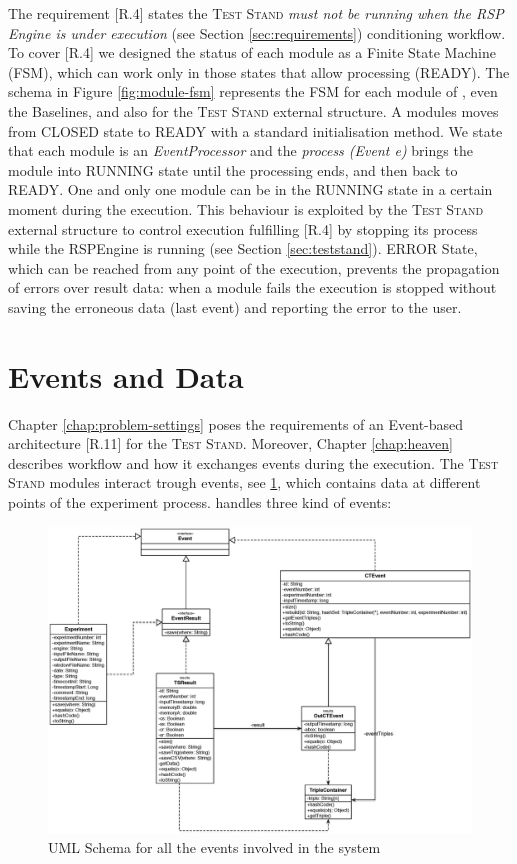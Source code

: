 The requirement [R.4] states the \textsc{Test Stand} \textit{must not be running when the RSP Engine is under execution} (see Section \ref{sec:requirements}) conditioning \name workflow. To cover [R.4] we designed the status of each module  as a Finite State Machine (FSM), which can work only in those states that allow processing (READY). The schema in Figure \ref{fig:module-fsm} represents the FSM for each module of \name, even the Baselines, and also for the \textsc{Test Stand} external structure. 
A modules moves from CLOSED state to READY with a standard initialisation method. We state that each module is an \textit{EventProcessor} and the \textit{ process (Event e)} brings the module into RUNNING state until the processing ends, and then back to READY. One and only one module can be in the RUNNING state in a certain moment during the execution. This behaviour is exploited by the \textsc{Test Stand} external structure to control execution fulfilling [R.4] by stopping its process while the RSPEngine is running (see Section \ref{sec:teststand}). ERROR State, which can be reached from any point of the execution, prevents the propagation of errors over result data: when a module fails the execution is stopped without saving the erroneous data (last event) and reporting the error to the user.


\section{Events and Data}\label{sec:data-impl}

Chapter \ref{chap:problem-settings} poses the requirements of an Event-based architecture [R.11] for the \textsc{Test Stand}. Moreover, Chapter \ref{chap:heaven} describes \name workflow and how it exchanges events during the execution. The \textsc{Test Stand} modules interact trough events, see \ref{fig:uml_events},  which contains data at different points of the experiment process. \name handles three kind of events:

\begin{figure}[tbh]
  \centering
	\includegraphics[width=\linewidth]{images/uml_events}
	\caption{UML Schema for all the events involved in the system} 
  	\label{fig:uml_events}
\end{figure}

